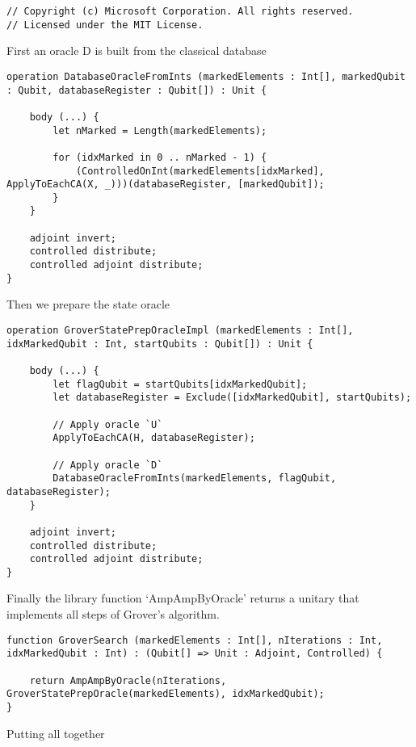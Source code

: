 \begin{lstlisting}
// Copyright (c) Microsoft Corporation. All rights reserved.
// Licensed under the MIT License.
\end{lstlisting}

\noindent First an oracle D is built from the classical database

\begin{lstlisting}
operation DatabaseOracleFromInts (markedElements : Int[], markedQubit : Qubit, databaseRegister : Qubit[]) : Unit {

	body (...) {
		let nMarked = Length(markedElements);
		
		for (idxMarked in 0 .. nMarked - 1) {
			(ControlledOnInt(markedElements[idxMarked], ApplyToEachCA(X, _)))(databaseRegister, [markedQubit]);
		}
	}
	
	adjoint invert;
	controlled distribute;
	controlled adjoint distribute;
}
\end{lstlisting}

\noindent Then we prepare the state oracle

\begin{lstlisting}
operation GroverStatePrepOracleImpl (markedElements : Int[], idxMarkedQubit : Int, startQubits : Qubit[]) : Unit {

	body (...) {
		let flagQubit = startQubits[idxMarkedQubit];
		let databaseRegister = Exclude([idxMarkedQubit], startQubits);
		
		// Apply oracle `U`
		ApplyToEachCA(H, databaseRegister);
		
		// Apply oracle `D`
		DatabaseOracleFromInts(markedElements, flagQubit, databaseRegister);
	}
	
	adjoint invert;
	controlled distribute;
	controlled adjoint distribute;
}
\end{lstlisting}

\noindent Finally the library function `AmpAmpByOracle' returns a unitary that implements all steps of Grover's algorithm.

\begin{lstlisting}
function GroverSearch (markedElements : Int[], nIterations : Int, idxMarkedQubit : Int) : (Qubit[] => Unit : Adjoint, Controlled) {

	return AmpAmpByOracle(nIterations, GroverStatePrepOracle(markedElements), idxMarkedQubit);
}
\end{lstlisting}

\noindent Putting all together

